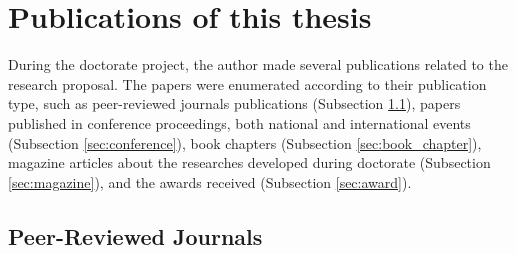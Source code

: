 \section{Publications of this thesis} \label{sec:publications}

During the doctorate project, the author made several publications related to the research proposal. The papers were enumerated according to their publication type, such as peer-reviewed journals publications (Subsection \ref{sec:peer_review}), papers published in conference proceedings, both national and international events (Subsection \ref{sec:conference}), book chapters (Subsection \ref{sec:book_chapter}), magazine articles about the researches developed during doctorate (Subsection \ref{sec:magazine}), and the awards received (Subsection \ref{sec:award}).

\subsection{Peer-Reviewed Journals} \label{sec:peer_review}


